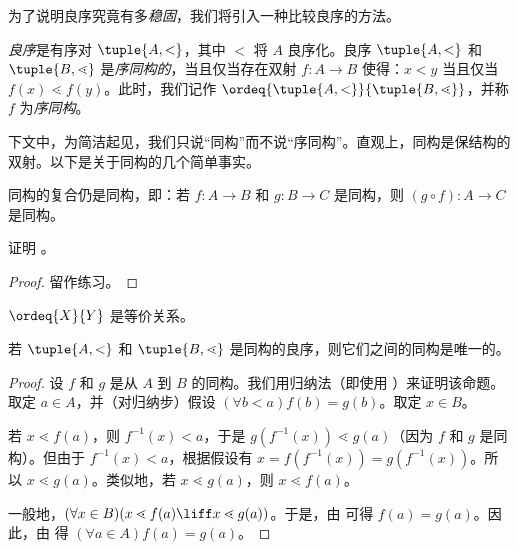 \documentclass[../../../include/open-logic-section]{subfiles}
\begin{document}

为了说明良序究竟有多\emph{稳固}，我们将引入一种比较良序的方法。

\begin{defn}
\emph{良序}是有序对 $\tuple{A, <}$，其中 $<$ 将 $A$ 良序化。良序 $\tuple{A, <}$ 和 $\tuple{B, \lessdot}$ 是\emph{序同构的}，当且仅当存在双射 $f \colon A \to B$ 使得：$x < y$ 当且仅当 $f(x) \lessdot f(y)$。此时，我们记作 $\ordeq{\tuple{A, <}}{\tuple{B, \lessdot}}$，并称 $f$ 为\emph{序同构}。
\end{defn}

\noindent
下文中，为简洁起见，我们只说“同构”而不说“序同构”。直观上，同构是保结构的双射。以下是关于同构的几个简单事实。

\begin{lem}
同构的复合仍是同构，即：若 $f \colon A \to B$ 和 $g \colon B \to C$ 是同构，则 $(g \circ f) \colon A \to C$ 是同构。
\end{lem}

\begin{prob}
证明 。
\end{prob}

\begin{proof}
留作练习。
\end{proof}

\begin{cor}
$\ordeq{X}{Y}$ 是等价关系。
\end{cor}

\begin{prop}
若 $\tuple{A, <}$ 和 $\tuple{B, \lessdot}$ 是同构的良序，则它们之间的同构是唯一的。
\end{prop}

\begin{proof}
设 $f$ 和 $g$ 是从 $A$ 到 $B$ 的同构。我们用归纳法（即使用 ）来证明该命题。取定 $a\in A$，并（对归纳步）假设 $(\forall b < a)f(b) = g(b)$。取定 $x \in B$。

若 $x \lessdot f(a)$，则 $f^{-1}(x) < a$，于是 $g(f^{-1}(x)) \lessdot
g(a)$（因为 $f$ 和 $g$ 是同构）。但由于 $f^{-1}(x) < a$，根据假设有 $x =f(f^{-1}(x)) = g(f^{-1}(x))$。所以 $x \lessdot g(a)$。类似地，若 $x \lessdot g(a)$，则 $x \lessdot f(a)$。

一般地，$(\forall x \in B)(x \lessdot f(a) \liff x \lessdot
g(a))$。于是，由  可得 $f(a) = g(a)$。因此，由  得 $(\forall
a \in A)f(a) = g(a)$。
\end{proof}
\end{document}
